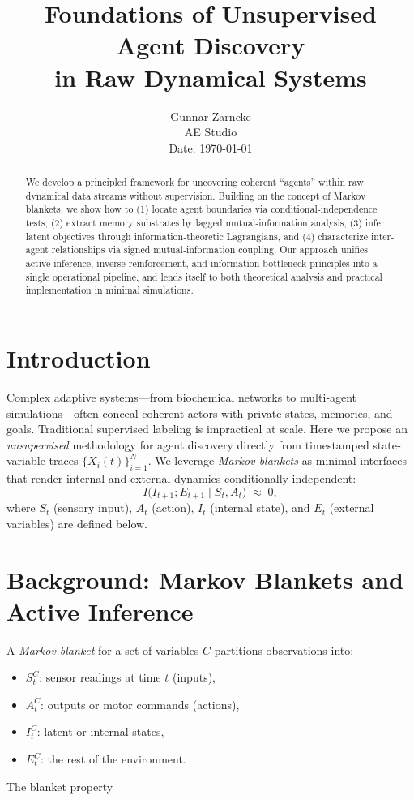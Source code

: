 \documentclass[10pt,conference]{IEEEtran}
\begin{document}
\title{Foundations of Unsupervised Agent Discovery\\in Raw Dynamical Systems}

\author{Gunnar Zarncke\\
AE Studio\\
\small{Date: \today}}

\maketitle

\begin{abstract}
We develop a principled framework for uncovering coherent ``agents'' within raw dynamical data streams without supervision.  Building on the concept of Markov blankets, we show how to (1) locate agent boundaries via conditional‐independence tests, (2) extract memory substrates by lagged mutual‐information analysis, (3) infer latent objectives through information‐theoretic Lagrangians, and (4) characterize inter‐agent relationships via signed mutual‐information coupling.  Our approach unifies active‐inference, inverse‐reinforcement, and information‐bottleneck principles into a single operational pipeline, and lends itself to both theoretical analysis and practical implementation in minimal simulations.
\end{abstract}

\section{Introduction}
Complex adaptive systems—from biochemical networks to multi‐agent simulations—often conceal coherent actors with private states, memories, and goals.  Traditional supervised labeling is impractical at scale.  Here we propose an \emph{unsupervised} methodology for agent discovery directly from timestamped state‐variable traces $\{X_i(t)\}_{i=1}^N$.  We leverage \emph{Markov blankets} \cite{ConantAshby1970,Friston2010} as minimal interfaces that render internal and external dynamics conditionally independent:
\begin{equation}
I\bigl(I_{t+1};E_{t+1}\mid S_t,A_t\bigr)\;\approx\;0,
\end{equation}
where $S_t$ (sensory input), $A_t$ (action), $I_t$ (internal state), and $E_t$ (external variables) \cite{Kirchhoff2018} are defined below.

\section{Background: Markov Blankets and Active Inference}
A \emph{Markov blanket} for a set of variables $C$ partitions observations into:
\begin{itemize}
  \item $S^C_t$: sensor readings at time $t$ (inputs),
  \item $A^C_t$: outputs or motor commands (actions),
  \item $I^C_t$: latent or internal states,
  \item $E^C_t$: the rest of the environment.
\end{itemize}
The blanket property
\end{document}
